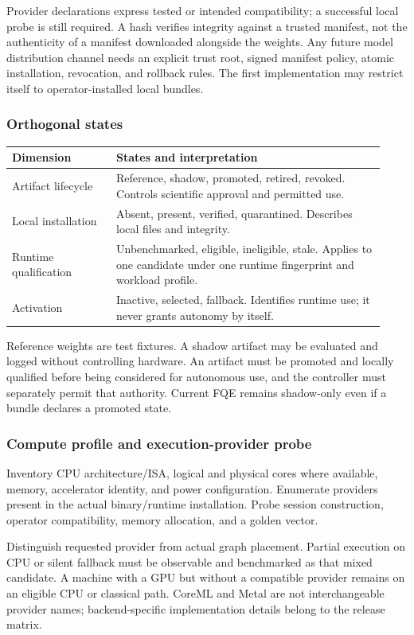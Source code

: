 \documentclass[11pt,a4paper]{article}
\begin{document}
Provider declarations express tested or intended compatibility; a successful
local probe is still required. A hash verifies integrity against a trusted
manifest, not the authenticity of a manifest downloaded alongside the weights.
Any future model distribution channel needs an explicit trust root, signed
manifest policy, atomic installation, revocation, and rollback rules. The first
implementation may restrict itself to operator-installed local bundles.

\subsubsection{Orthogonal states}
\begin{longtable}{@{}L{0.26\linewidth}L{0.67\linewidth}@{}}
\toprule Dimension & States and interpretation\\\midrule\endhead
Artifact lifecycle & Reference, shadow, promoted, retired, revoked. Controls
scientific approval and permitted use.\\
Local installation & Absent, present, verified, quarantined. Describes local
files and integrity.\\
Runtime qualification & Unbenchmarked, eligible, ineligible, stale. Applies to
one candidate under one runtime fingerprint and workload profile.\\
Activation & Inactive, selected, fallback. Identifies runtime use; it never
grants autonomy by itself.\\
\bottomrule
\end{longtable}
Reference weights are test fixtures. A shadow artifact may be evaluated and
logged without controlling hardware. An artifact must be promoted and locally
qualified before being considered for autonomous use, and the controller must
separately permit that authority. Current FQE remains shadow-only even if a
bundle declares a promoted state.

\subsubsection{Compute profile and execution-provider probe}
Inventory CPU architecture/ISA, logical and physical cores where available,
memory, accelerator identity, and power configuration. Enumerate providers
present in the actual binary/runtime installation. Probe session construction,
operator compatibility, memory allocation, and a golden vector.

Distinguish requested provider from actual graph placement. Partial execution
on CPU or silent fallback must be observable and benchmarked as that mixed
candidate. A machine with a GPU but without a compatible provider remains on
an eligible CPU or classical path. CoreML and Metal are not interchangeable
provider names; backend-specific implementation details belong to the release
matrix.
\end{document}
